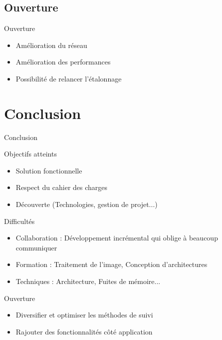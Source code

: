 \documentclass{beamer}
\begin{document}
		\subsection{Ouverture}
		\begin{frame}{Ouverture}
			\begin{itemize}
				\item Amélioration du réseau
				\item Amélioration des performances
				\item Possibilité de relancer l'étalonnage
			\end{itemize}
		\end{frame}

	
      \section{Conclusion}
            \begin{frame}{Conclusion}
                  \begin{exampleblock}{Objectifs atteints}
			\begin{itemize}
                        \item Solution fonctionnelle \\
                        \item Respect du cahier des charges \\
                        \item Découverte (Technologies, gestion de projet...) \\ 
			\end{itemize}
                  \end{exampleblock}
                  \pause
                  \begin{alertblock}{Difficultés}
			\begin{itemize}
                        \item Collaboration : Développement incrémental qui oblige à beaucoup communiquer \\
                        \item Formation : Traitement de l'image, Conception d'architectures \\
                        \item Techniques : Architecture, Fuites de mémoire...\\
			\end{itemize}
                  \end{alertblock}
                  \pause
                  \begin{block}{Ouverture}
			\begin{itemize}
                        \item Diversifier et optimiser les méthodes de suivi \\
                        \item Rajouter des fonctionnalités côté application \\
			\end{itemize}
                  \end{block}
	\end{frame}
      
\end{document}
